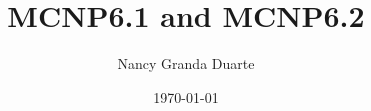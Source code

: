 \documentclass[12pt, letterpaper]{article}
\title{MCNP6.1 and MCNP6.2}
\author{Nancy Granda Duarte}
\date{\today}
\begin{document}
\maketitle






{}
\end{document}
